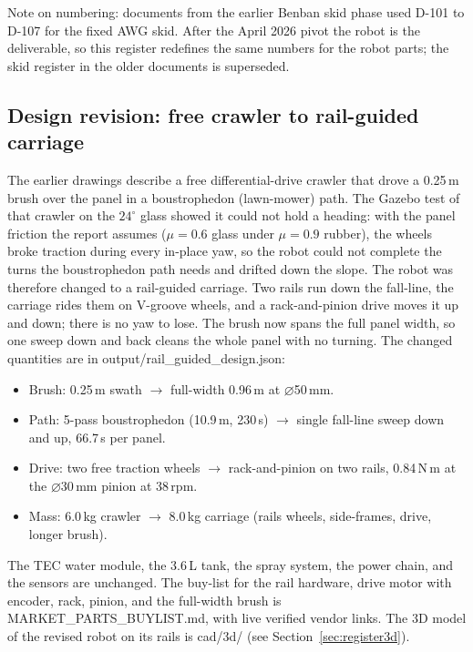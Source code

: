 \documentclass[11pt,a4paper]{article}
\newcommand{\fpath}[1]{{\ttfamily\small #1}}
\begin{document}
Note on numbering: documents from the earlier Benban skid phase used D-101 to
D-107 for the fixed AWG skid. After the April 2026 pivot the robot is the
deliverable, so this register redefines the same numbers for the robot parts;
the skid register in the older documents is superseded.

\subsection{Design revision: free crawler to rail-guided carriage}
\label{sec:railrev}
The earlier drawings describe a free differential-drive crawler that drove a
0.25\,m brush over the panel in a boustrophedon (lawn-mower) path. The Gazebo
test of that crawler on the $24^\circ$ glass showed it could not hold a
heading: with the panel friction the report assumes ($\mu=0.6$ glass under
$\mu=0.9$ rubber), the wheels broke traction during every in-place yaw, so the
robot could not complete the turns the boustrophedon path needs and drifted
down the slope. The robot was therefore changed to a rail-guided carriage. Two
rails run down the fall-line, the carriage rides them on V-groove wheels, and a
rack-and-pinion drive moves it up and down; there is no yaw to lose. The brush
now spans the full panel width, so one sweep down and back cleans the whole
panel with no turning. The changed quantities are in
\fpath{output/rail\_guided\_design.json}:

\begin{itemize}\setlength\itemsep{1pt}
  \item Brush: 0.25\,m swath $\rightarrow$ full-width 0.96\,m at $\varnothing$50\,mm.
  \item Path: 5-pass boustrophedon (10.9\,m, 230\,s) $\rightarrow$ single
        fall-line sweep down and up, 66.7\,s per panel.
  \item Drive: two free traction wheels $\rightarrow$ rack-and-pinion on two
        rails, 0.84\,N\,m at the $\varnothing$30\,mm pinion at 38\,rpm.
  \item Mass: 6.0\,kg crawler $\rightarrow$ 8.0\,kg carriage (rails wheels,
        side-frames, drive, longer brush).
\end{itemize}

The TEC water module, the 3.6\,L tank, the spray system, the power chain, and
the sensors are unchanged. The buy-list for the rail hardware, drive motor with
encoder, rack, pinion, and the full-width brush is
\fpath{MARKET\_PARTS\_BUYLIST.md}, with live verified vendor links. The 3D
model of the revised robot on its rails is \fpath{cad/3d/} (see
Section~\ref{sec:register3d}).
\end{document}
